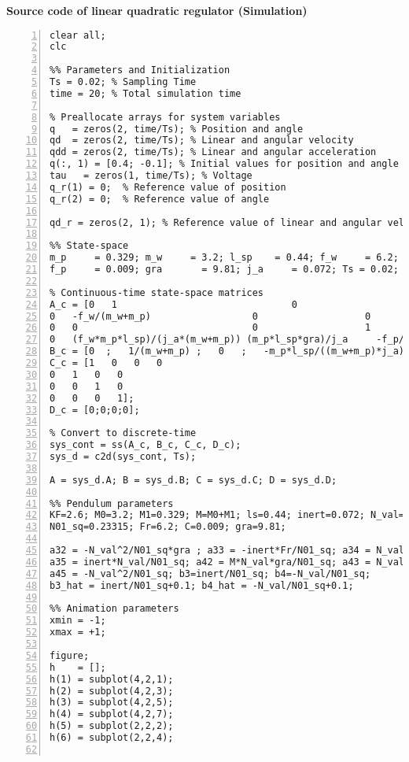 \normalsize\bf{Source code of linear quadratic regulator (Simulation)}
\label{lqrSim.m}
\vspace{1cm}
\begin{lstlisting}[numbers=left,basicstyle=\scriptsize,caption={Source code of linear quadratic regulator (Simulation).},captionpos=b]	
clear all;
clc

%% Parameters and Initialization
Ts = 0.02; % Sampling Time
time = 20; % Total simulation time

% Preallocate arrays for system variables
q   = zeros(2, time/Ts); % Position and angle
qd  = zeros(2, time/Ts); % Linear and angular velocity
qdd = zeros(2, time/Ts); % Linear and angular acceleration
q(:, 1) = [0.4; -0.1]; % Initial values for position and angle
tau   = zeros(1, time/Ts); % Voltage
q_r(1) = 0;  % Reference value of position
q_r(2) = 0;  % Reference value of angle

qd_r = zeros(2, 1); % Reference value of linear and angular velocity

%% State-space
m_p     = 0.329; m_w     = 3.2; l_sp    = 0.44; f_w     = 6.2; 
f_p     = 0.009; gra       = 9.81; j_a     = 0.072; Ts = 0.02; 

% Continuous-time state-space matrices
A_c = [0   1                               0                   0
0   -f_w/(m_w+m_p)                  0                   0
0   0                               0                   1
0   (f_w*m_p*l_sp)/(j_a*(m_w+m_p)) (m_p*l_sp*gra)/j_a     -f_p/j_a];   
B_c = [0  ;   1/(m_w+m_p) ;   0   ;   -m_p*l_sp/((m_w+m_p)*j_a)];
C_c = [1   0   0   0
0   1   0   0
0   0   1   0
0   0   0   1];
D_c = [0;0;0;0];

% Convert to discrete-time
sys_cont = ss(A_c, B_c, C_c, D_c);
sys_d = c2d(sys_cont, Ts);

A = sys_d.A; B = sys_d.B; C = sys_d.C; D = sys_d.D;

%% Pendulum parameters
KF=2.6; M0=3.2; M1=0.329; M=M0+M1; ls=0.44; inert=0.072; N_val=0.1446;
N01_sq=0.23315; Fr=6.2; C=0.009; gra=9.81;

a32 = -N_val^2/N01_sq*gra ; a33 = -inert*Fr/N01_sq; a34 = N_val*C/N01_sq; 
a35 = inert*N_val/N01_sq; a42 = M*N_val*gra/N01_sq; a43 = N_val*Fr/N01_sq; a44 = -M*C/N01_sq;
a45 = -N_val^2/N01_sq; b3=inert/N01_sq; b4=-N_val/N01_sq;
b3_hat = inert/N01_sq+0.1; b4_hat = -N_val/N01_sq+0.1;

%% Animation parameters
xmin = -1;
xmax = +1;

figure;
h    = [];
h(1) = subplot(4,2,1);
h(2) = subplot(4,2,3);
h(3) = subplot(4,2,5);
h(4) = subplot(4,2,7);
h(5) = subplot(2,2,2);
h(6) = subplot(2,2,4);


\end{lstlisting}

